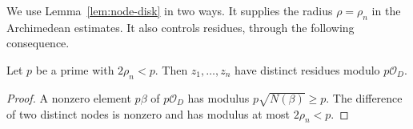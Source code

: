 We use Lemma~\ref{lem:node-disk} in two ways. It supplies the radius
$\rho=\rho_n$ in the Archimedean estimates. It also controls residues, through
the following consequence.

\begin{corollary}\label{cor:distinct-residues}
Let $p$ be a prime with $2\rho_n<p$. Then $z_1,\dots,z_n$ have
distinct residues modulo $p\mathcal{O}_D$.
\end{corollary}

\begin{proof}
A nonzero element $p\beta$ of $p\mathcal{O}_D$ has modulus
$p\sqrt{N(\beta)}\ge p$. The difference of two distinct nodes is nonzero and
has modulus at most $2\rho_n<p$.
\end{proof}


